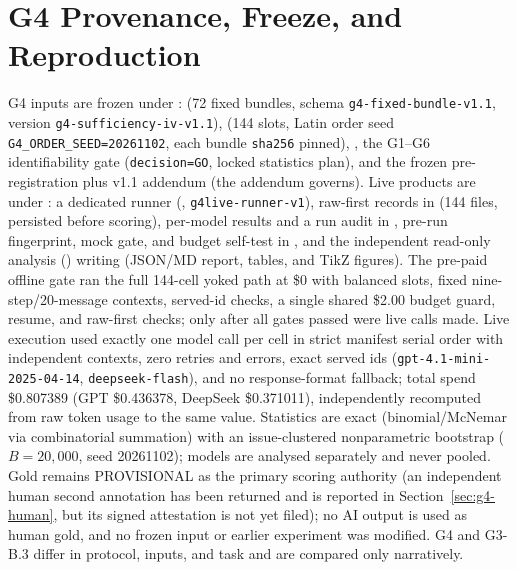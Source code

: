 \section{G4 Provenance, Freeze, and Reproduction}
\label{app:g4provenance}
G4 inputs are frozen under :
 (72 fixed bundles, schema
\texttt{g4-fixed-bundle-v1.1}, version \texttt{g4-sufficiency-iv-v1.1}),
 (144 slots, Latin order seed
\texttt{G4\_ORDER\_SEED=20261102}, each bundle \texttt{sha256} pinned),
, the G1--G6 identifiability gate
(\texttt{decision=GO}, locked statistics plan), and the frozen
pre-registration plus v1.1 addendum (the addendum governs). Live products are
under : a dedicated runner
(, \texttt{g4live-runner-v1}), raw-first records
in  (144 files, persisted before scoring), per-model results
and a run audit in , pre-run fingerprint, mock gate, and budget
self-test in , and the independent read-only analysis
() writing  (JSON/MD report,
tables, and TikZ figures). The pre-paid offline gate ran the full 144-cell
yoked path at \$0 with balanced slots, fixed nine-step/20-message contexts,
served-id checks, a single shared \$2.00 budget guard, resume, and raw-first
checks; only after all gates passed were live calls made. Live execution used
exactly one model call per cell in strict manifest serial order with
independent contexts, zero retries and errors, exact served ids
(\texttt{gpt-4.1-mini-2025-04-14}, \texttt{deepseek-flash}), and no
response-format fallback; total spend \$0.807389 (GPT \$0.436378, DeepSeek
\$0.371011), independently recomputed from raw token usage to the same value.
Statistics are exact (binomial/McNemar via combinatorial summation) with an
issue-clustered nonparametric bootstrap ($B=20{,}000$, seed 20261102); models
are analysed separately and never pooled. Gold remains PROVISIONAL as the
primary scoring authority (an independent human second annotation has been
returned and is reported in Section~\ref{sec:g4-human}, but its signed
attestation is not yet filed); no AI output is used as human gold, and
no frozen input or earlier experiment was modified. G4 and G3-B.3 differ in
protocol, inputs, and task and are compared only narratively.

